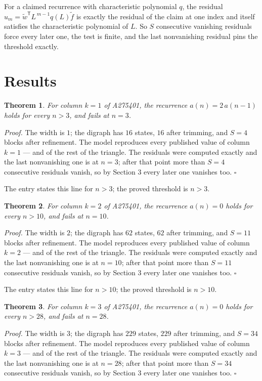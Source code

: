 \documentclass[11pt]{article}
\newtheorem{theorem}{Theorem}
\theoremstyle{definition}
\begin{document}
For a claimed recurrence with characteristic polynomial $q$, the residual $u_m = \tilde w^{\mathsf T}L^{\,m-1}q(L)\tilde f$ is exactly the residual of the claim at one index and itself satisfies the characteristic polynomial of $L$. So $S$ consecutive vanishing residuals force every later one, the test is finite, and the last nonvanishing residual pins the threshold exactly.

\section{Results}

\begin{theorem} For column $k = 1$ of A275401, the recurrence $a(n) = 2\,a(n-1)$ holds for every $n > 3$, and fails at $n = 3$.\end{theorem}

{\itshape Proof.} The width is $1$; the digraph has $16$ states, $16$ after trimming, and $S = 4$ blocks after refinement. The model reproduces every published value of column $k = 1$ --- and of the rest of the triangle. The residuals were computed exactly and the last nonvanishing one is at $n = 3$; after that point more than $S = 4$ consecutive residuals vanish, so by Section 3 every later one vanishes too. $\square$

The entry states this line for $n > 3$; the proved threshold is $n > 3$.

\begin{theorem} For column $k = 2$ of A275401, the recurrence $a(n) = 0$ holds for every $n > 10$, and fails at $n = 10$.\end{theorem}

{\itshape Proof.} The width is $2$; the digraph has $62$ states, $62$ after trimming, and $S = 11$ blocks after refinement. The model reproduces every published value of column $k = 2$ --- and of the rest of the triangle. The residuals were computed exactly and the last nonvanishing one is at $n = 10$; after that point more than $S = 11$ consecutive residuals vanish, so by Section 3 every later one vanishes too. $\square$

The entry states this line for $n > 10$; the proved threshold is $n > 10$.

\begin{theorem} For column $k = 3$ of A275401, the recurrence $a(n) = 0$ holds for every $n > 28$, and fails at $n = 28$.\end{theorem}

{\itshape Proof.} The width is $3$; the digraph has $229$ states, $229$ after trimming, and $S = 34$ blocks after refinement. The model reproduces every published value of column $k = 3$ --- and of the rest of the triangle. The residuals were computed exactly and the last nonvanishing one is at $n = 28$; after that point more than $S = 34$ consecutive residuals vanish, so by Section 3 every later one vanishes too. $\square$
\end{document}

